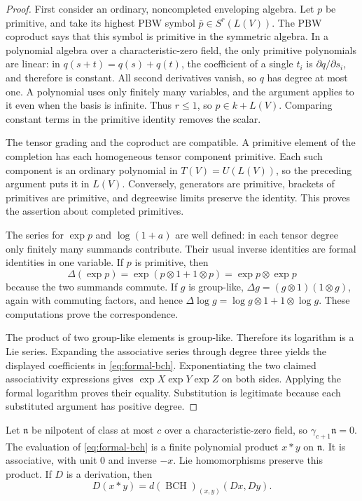 \begin{proof}
First consider an ordinary, noncompleted enveloping algebra.
Let \(p\) be primitive, and take its highest PBW symbol
\(\bar p\in S^r(L(V))\). The PBW coproduct says that this
symbol is primitive in the symmetric algebra.
In a polynomial algebra over a characteristic-zero field,
the only primitive polynomials are linear: in
\(q(s+t)=q(s)+q(t)\), the coefficient of a single \(t_i\)
is \(\partial q/\partial s_i\), and therefore is constant.
All second derivatives vanish, so \(q\) has degree at most
one. A polynomial uses only finitely many variables, and the
argument applies to it even when the basis is infinite.
Thus \(r\leq1\), so \(p\in k+L(V)\). Comparing constant terms
in the primitive identity removes the scalar.

The tensor grading and the coproduct are compatible. A
primitive element of the completion has each homogeneous
tensor component primitive. Each such component is an
ordinary polynomial in \(T(V)=U(L(V))\), so the preceding
argument puts it in \(L(V)\). Conversely, generators are
primitive, brackets of primitives are primitive, and degreewise
limits preserve the identity. This proves the assertion
about completed primitives.

The series for \(\exp p\) and \(\log(1+a)\) are well defined:
in each tensor degree only finitely many summands contribute.
Their usual inverse identities are formal identities in one
variable. If \(p\) is primitive, then
\[
 \Delta(\exp p)=\exp(p\otimes1+1\otimes p)
              =\exp p\otimes\exp p
\]
because the two summands commute. If \(g\) is group-like,
\(\Delta g=(g\otimes1)(1\otimes g)\), again with commuting
factors, and hence
\(\Delta\log g=\log g\otimes1+1\otimes\log g\).
These computations prove the correspondence.

The product of two group-like elements is group-like.
Therefore its logarithm is a Lie series. Expanding the
associative series through degree three yields the displayed
coefficients in \eqref{eq:formal-bch}. Exponentiating the two
claimed associativity expressions gives
\(\exp X\exp Y\exp Z\) on both sides. Applying the formal
logarithm proves their equality. Substitution is legitimate
because each substituted argument has positive degree.
\end{proof}

\begin{theorem}\label{res:A09}
Let \(\mathfrak n\) be nilpotent of class at most \(c\) over a
characteristic-zero field, so \(\gamma_{c+1}\mathfrak n=0\).
The evaluation of \eqref{eq:formal-bch} is a finite polynomial
product \(x*y\) on \(\mathfrak n\). It is associative, with unit
\(0\) and inverse \(-x\). Lie homomorphisms preserve this
product. If \(D\) is a derivation, then
\[
 D(x*y)=d(\operatorname{BCH})_{(x,y)}(Dx,Dy).
 \tag{1.5}\label{eq:bch-derivation}
\]
\end{theorem}

